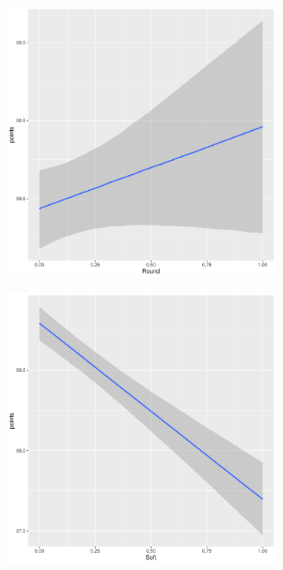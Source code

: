 \documentclass{article}
\begin{document}
\begin{figure}[htbp]
\begin{subfigure}{0.22\textwidth}
	\end{subfigure}\hfill
	\begin{subfigure}{0.22\textwidth}
		\includegraphics[width=\textwidth]{imgs/Rplots-21.pdf}
	\end{subfigure}\hfill
	\begin{subfigure}{0.22\textwidth}
		\includegraphics[width=\textwidth]{imgs/Rplots-22.pdf}
	\end{subfigure}
	

\end{figure}
\end{document}
